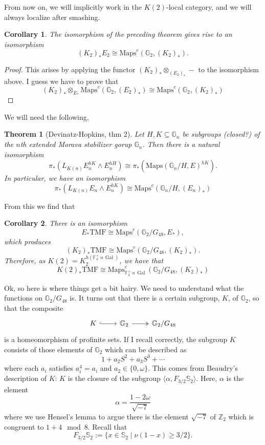 \documentclass[12pt]{amsart}
\newcommand{\Maps}{\mathrm{Maps}}
\newcommand{\Z}{\mathbb{Z}}
\newcommand{\F}{\mathbb{F}}
\newcommand{\G}{\mathbb{G}}
\newcommand{\TMF}{\mathrm{TMF}}
\DeclareMathOperator{\Gal}{Gal}
\newtheorem{thm}{Theorem}
\newtheorem{cor}{Corollary}
\theoremstyle{definition}
\numberwithin{equation}{section}
\numberwithin{figure}{section}
\begin{document}
From now on, we will implicitly work in the $K(2)$-local category, and we will always localize after smashing. 

\begin{cor}
	The isomorphism of the preceding theorem gives rise to an isomorphism
	\[
	(K_2)_*E_2\cong \Maps^c(\G_2, (K_2)_*).
	\]
\end{cor}
\begin{proof}
	This arises by applying the functor $(K_2)_*\otimes_{(E_2)_*}-$ to the isomorphism above. I guess we have to prove that 
	\[
	(K_2)_*\otimes_{E_*}\Maps^c(\G_2, (E_2)_*)\cong \Maps^c(\G_2, (K_2)_*)
	\]
\end{proof}

We will need the following,

\begin{thm}[Devinatz-Hopkins, thm 2]
	Let $H, K\subseteq \G_n$ be subgroups (closed?) of the $n$th extended Morava stabilizer gorup $\G_n$. Then there is a natural isomorphism
	\[
	\pi_*(L_{K(n)}E_n^{hK}\wedge E_n^{hH})\cong \pi_*(\Maps(\G_n/H, E)^{hK}).
	\]
	In particular, we have an isomorphism
	\[
	\pi_*(L_{K(n)}E_n\wedge E_n^{hK})\cong \Maps^c(\G_n/H, (E_n)_*)
	\]
\end{thm}

From this we find that 

\begin{cor}
	There is an isomorphism
	\[
	E_*\TMF\cong \Maps^c(\G_2/G_{48}, E_*), 
	\]
	which produces 
	\[
	(K_2)_*\TMF\cong \Maps^c(\G_2/G_{48}, (K_2)_*).
	\]
	Therefore, as $K(2) = K_2^{h(\F_4^\times\rtimes \Gal)}$, we have that 
	\[
	K(2)_*\TMF \cong \Maps^c_{\F_4^\times \rtimes \Gal}(\G_2/G_{48}, (K_2)_*)
	\]
\end{cor}

Ok, so here is where things get a bit hairy. We need to understand what the functions on $\G_2/G_{48}$ is. It turns out that there is a certain subgroup, $K$, of $\G_2$, so that the composite
\[
\begin{tikzcd}
	K\arrow[r, hook] & \G_2\arrow[r, two heads] & \G_2/G_{48}
\end{tikzcd}
\]
is a homeomorphism of profinite sets. If I recall correctly, the subgroup $K$ consists of those elements of $\G_2$ which can be described as 
\[
1+a_2S^2+a_3S^3+\cdots 
\]
where each $a_i$ satisfies $a_i^4=a_i$ and $a_2\in \{0, \omega\}$. This comes from Beaudry's description of $K$: $K$ is the closure of the subgroup $\langle \alpha, F_{3/2}\mathbb{S}_2\rangle$. Here, $\alpha$ is the element 
\[
\alpha = \frac{1-2\omega}{\sqrt{-7}}
\] 
where we use Hensel's lemma to argue there is the element $\sqrt{-7}$ of $\Z_2$ which is congruent to $1+4\mod 8$. Recall that 
\[
F_{3/2}\mathbb{S}_2 := \{x\in \mathbb{S}_2\mid \nu(1-x)\geq 3/2\}.
\]
\end{document}
